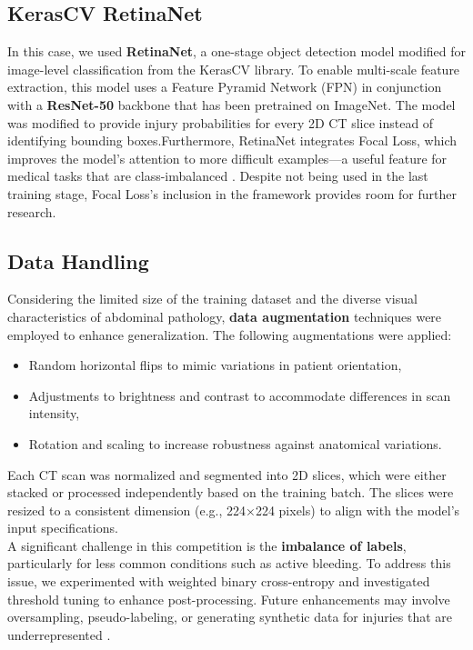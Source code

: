 \documentclass[a4paper,12pt]{article}
\begin{document}
\subsection{KerasCV RetinaNet}
In this case, we used \textbf{RetinaNet}, a one-stage object detection model modified for image-level classification from the KerasCV library. To enable multi-scale feature extraction, this model uses a Feature Pyramid Network (FPN) in conjunction with a \textbf{ResNet-50} backbone that has been pretrained on ImageNet. The model was modified to provide injury probabilities for every 2D CT slice instead of identifying bounding boxes.Furthermore, RetinaNet integrates Focal Loss, which improves the model's attention to more difficult examples—a useful feature for medical tasks that are class-imbalanced \cite{lin2017focal}. Despite not being used in the last training stage, Focal Loss's inclusion in the framework provides room for further research.
\subsection{Data Handling}
Considering the limited size of the training dataset and the diverse visual characteristics of abdominal pathology, \textbf{data augmentation} techniques were employed to enhance generalization. The following augmentations were applied:
\begin{itemize}
    \item Random horizontal flips to mimic variations in patient orientation,
    \item Adjustments to brightness and contrast to accommodate differences in scan intensity,
    \item Rotation and scaling to increase robustness against anatomical variations.
\end{itemize}
Each CT scan was normalized and segmented into 2D slices, which were either stacked or processed independently based on the training batch. The slices were resized to a consistent dimension (e.g., 224×224 pixels) to align with the model's input specifications.\\

A significant challenge in this competition is the \textbf{imbalance of labels}, particularly for less common conditions such as active bleeding. To address this issue, we experimented with weighted binary cross-entropy and investigated threshold tuning to enhance post-processing. Future enhancements may involve oversampling, pseudo-labeling, or generating synthetic data for injuries that are underrepresented \cite{johnson2019survey}.
\end{document}
